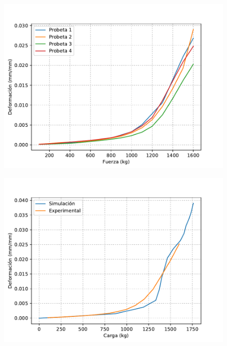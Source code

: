 \begin{center}
\includegraphics[width=0.85\textwidth]{src/ch4/experimental_probetas.pdf}
\label{fig:experimental_probetas}
\end{center}

\begin{center}
\includegraphics[width=0.85\textwidth]{src/ch4/experimental_vs_simulacion.pdf}
\label{fig:experimental_vs_simulacion}
\end{center}